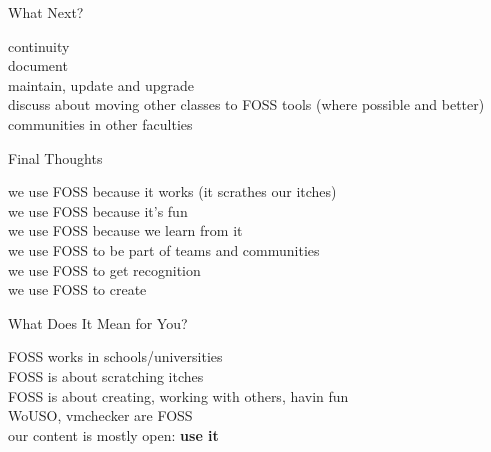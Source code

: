 \documentclass{paper}
\begin{document}
\begin{frame}{What Next?}
  \begin{center}
    {\large
      \pause continuity \\
      \vspace{0.3cm}
      \pause document \\
      \vspace{0.3cm}
      \pause maintain, update and upgrade \\
      \vspace{0.3cm}
      \pause discuss about moving other classes to FOSS tools (where possible
      and better) \\
      \vspace{0.3cm}
      \pause communities in other faculties
    }
  \end{center}
\end{frame}

\begin{frame}{Final Thoughts}
  \begin{center}
    {\large
      \pause we use FOSS because it works (it scrathes our itches) \\
      \vspace{0.3cm}
      \pause we use FOSS because it's fun \\
      \vspace{0.3cm}
      \pause we use FOSS because we learn from it \\
      \vspace{0.3cm}
      \pause we use FOSS to be part of teams and communities \\
      \vspace{0.3cm}
      \pause we use FOSS to get recognition \\
      \vspace{0.3cm}
      \pause we use FOSS to create
      \vspace{0.3cm}
    }
  \end{center}
\end{frame}

\begin{frame}{What Does It Mean for You?}
  \begin{center}
    {\large
      \pause FOSS works in schools/universities \\
      \vspace{0.3cm}
      \pause FOSS is about scratching itches \\
      \vspace{0.3cm}
      \pause FOSS is about creating, working with others, havin fun \\
      \vspace{0.3cm}
      \pause WoUSO, vmchecker are FOSS \\
      \vspace{0.3cm}
      \pause our content is mostly open: \textbf{use it}
    }
  \end{center}
\end{frame}
\end{document}
